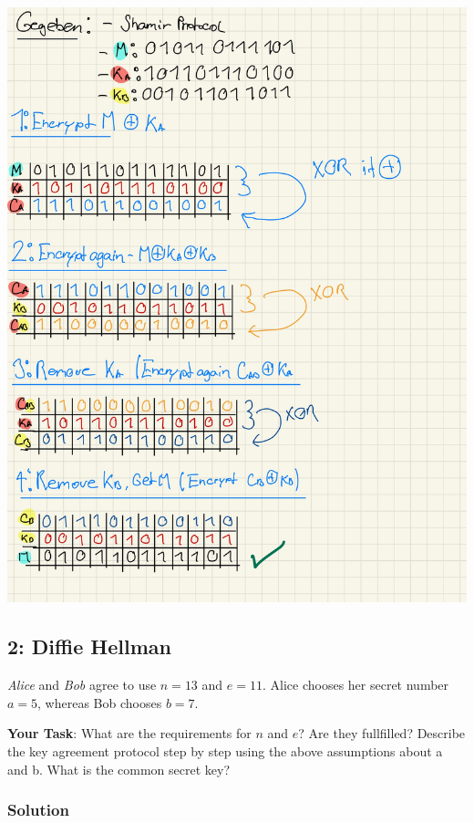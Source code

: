 \documentclass[11pt]{article}
\begin{document}
\includegraphics{img/psol3.jpg}

\newpage

    \hypertarget{diffie-hellman}{%
\subsection{2: Diffie Hellman}\label{diffie-hellman}}

\emph{Alice} and \emph{Bob} agree to use \(n = 13\) and \(e = 11\).
Alice chooses her secret number \(a = 5\), whereas Bob chooses
\(b = 7\).

\textbf{Your Task}: What are the requirements for \(n\) and \(e\)? Are
they fullfilled? Describe the key agreement protocol step by step using
the above assumptions about a and b. What is the common secret key?

\hypertarget{solution}{%
\subsubsection{Solution}\label{solution}}
\end{document}
